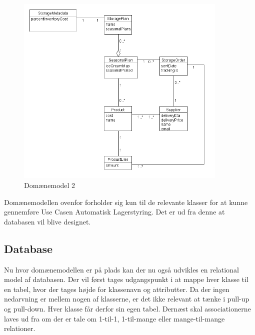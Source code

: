 \begin{figure}[H]
    \centering
    \includegraphics[width=0.9\textwidth]{figures/krav/domain_model_2.png}
    \caption{Domænemodel 2}
    \label{fig:domain_model_2}
\end{figure}

Domænemodellen ovenfor forholder sig kun til de relevante klasser for at kunne gennemføre Use Casen Automatisk Lagerstyring. Det er ud fra denne at databasen vil blive designet.

\subsection{Database}
Nu hvor domænemodellen er på plads kan der nu også udvikles en relational model af databasen. Der vil først tages udgangspunkt i at mappe hver klasse til en tabel, hvor der tages højde for klassenavn og attributter.
Da der ingen nedarvning er mellem nogen af klasserne, er det ikke relevant at tænke i pull-up og pull-down. Hver klasse får derfor sin egen tabel.
Dernæst skal associationerne laves ud fra om der er tale om 1-til-1, 1-til-mange eller mange-til-mange relationer. 

